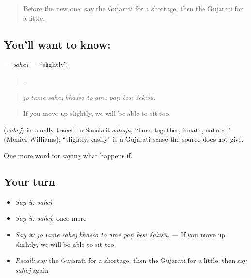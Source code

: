 \label{lesson:GU-C380-sahej}



\begin{quote}
Before the new one: say the Gujarati for a shortage, then the Gujarati for a little.
\end{quote}

\subsection*{You'll want to know: }
\textbf{} — \emph{sahej} — \textquotedblleft{}slightly\textquotedblright{}.

\begin{quote}
        .
\end{quote}

\begin{quote}
\emph{jo tame sahej khasśo to ame paṇ besī śakīśũ.}
\end{quote}

\begin{quote}
If you move up slightly, we will be able to sit too.
\end{quote}

\begin{cousinweb}
\textbf{} (\emph{sahej}) is usually traced to Sanskrit \emph{sahaja}, \textquotedblleft{}born together, innate, natural\textquotedblright{} (Monier-Williams); \textquotedblleft{}slightly, easily\textquotedblright{} is a Gujarati sense the source does not give.
\end{cousinweb}

\begin{grammarlens}[title={What you've built}]
One more word for saying what happens if.
\end{grammarlens}

\subsection*{Your turn}
\begin{itemize}
\raggedright
  \item \emph{Say it:} \emph{sahej}
  \item \emph{Say it:} \emph{sahej}, once more
  \item \emph{Say it:} \emph{jo tame sahej khasśo to ame paṇ besī śakīśũ.} — If you move up slightly, we will be able to sit too.
  \item \emph{Recall:} say the Gujarati for a shortage, then the Gujarati for a little, then say \emph{sahej} again
\end{itemize}

